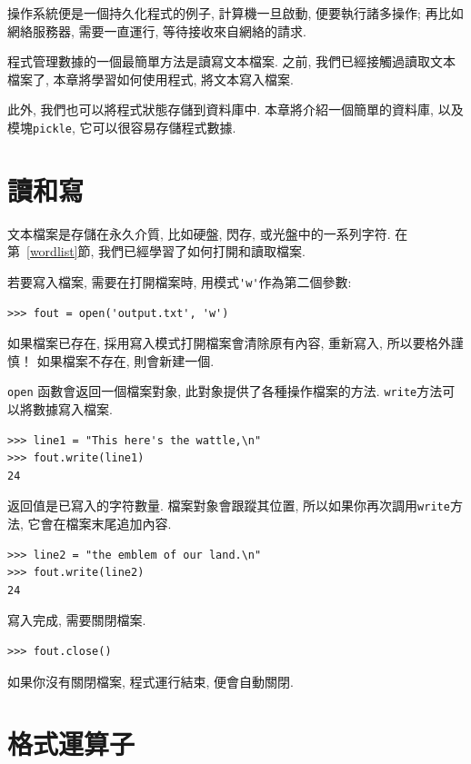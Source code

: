 \documentclass[10pt]{book}
\begin{document}
操作系統便是一個持久化程式的例子, 計算機一旦啟動, 便要執行諸多操作;
再比如網絡服務器, 需要一直運行, 等待接收來自網絡的請求. 

程式管理數據的一個最簡單方法是讀寫文本檔案. 
之前, 我們已經接觸過讀取文本檔案了, 
本章將學習如何使用程式, 將文本寫入檔案. 

此外, 我們也可以將程式狀態存儲到資料庫中. 
本章將介紹一個簡單的資料庫, 以及模塊{\tt pickle}, 
它可以很容易存儲程式數據. 


\section{讀和寫}

文本檔案是存儲在永久介質, 比如硬盤, 閃存, 或光盤中的一系列字符. 
在第~\ref{wordlist}節, 我們已經學習了如何打開和讀取檔案. 

若要寫入檔案, 需要在打開檔案時, 用模式\verb"'w'"作為第二個參數:

\begin{verbatim}
>>> fout = open('output.txt', 'w')
\end{verbatim}
%
如果檔案已存在, 採用寫入模式打開檔案會清除原有內容, 重新寫入, 所以要格外謹慎！
如果檔案不存在, 則會新建一個. 

{\tt open} 函數會返回一個檔案對象, 此對象提供了各種操作檔案的方法. 
{\tt write}方法可以將數據寫入檔案. 

\begin{verbatim}
>>> line1 = "This here's the wattle,\n"
>>> fout.write(line1)
24
\end{verbatim}
%

返回值是已寫入的字符數量. 
檔案對象會跟蹤其位置, 所以如果你再次調用{\tt write}方法, 
它會在檔案末尾追加內容. 

\begin{verbatim}
>>> line2 = "the emblem of our land.\n"
>>> fout.write(line2)
24
\end{verbatim}
%
寫入完成, 需要關閉檔案. 

\begin{verbatim}
>>> fout.close()
\end{verbatim}
%
%
如果你沒有關閉檔案, 程式運行結束, 便會自動關閉. 


\section{格式運算子}
\end{document}
